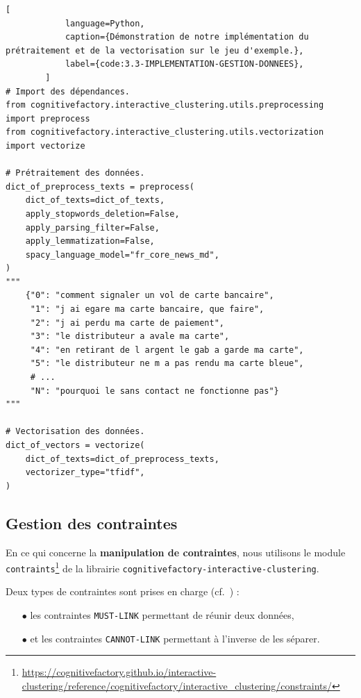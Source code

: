 		\begin{lstlisting}[
			language=Python,
			caption={Démonstration de notre implémentation du prétraitement et de la vectorisation sur le jeu d'exemple.},
			label={code:3.3-IMPLEMENTATION-GESTION-DONNEES},
		]
# Import des dépendances.
from cognitivefactory.interactive_clustering.utils.preprocessing import preprocess
from cognitivefactory.interactive_clustering.utils.vectorization import vectorize

# Prétraitement des données.
dict_of_preprocess_texts = preprocess(
    dict_of_texts=dict_of_texts,
    apply_stopwords_deletion=False,
    apply_parsing_filter=False,
    apply_lemmatization=False,
    spacy_language_model="fr_core_news_md",
)
"""
    {"0": "comment signaler un vol de carte bancaire",
     "1": "j ai egare ma carte bancaire, que faire",
     "2": "j ai perdu ma carte de paiement",
     "3": "le distributeur a avale ma carte",
     "4": "en retirant de l argent le gab a garde ma carte",
     "5": "le distributeur ne m a pas rendu ma carte bleue",
     # ...
     "N": "pourquoi le sans contact ne fonctionne pas"}
"""

# Vectorisation des données.
dict_of_vectors = vectorize(
    dict_of_texts=dict_of_preprocess_texts,
    vectorizer_type="tfidf",
)
		\end{lstlisting}
		
		\subsection{Gestion des contraintes}
		\label{section:3.3.2-GESTION-DES-CONTRAINTES}
		
		En ce qui concerne la \textbf{manipulation de contraintes}, nous utilisons le module \texttt{contraints}\footnote{\url{https://cognitivefactory.github.io/interactive-clustering/reference/cognitivefactory/interactive_clustering/constraints/}} de la librairie \texttt{cognitivefactory-interactive-clustering}.
		
		Deux types de contraintes sont prises en charge (cf.~\cite{wagstaff-cardie:2000:clustering-instancelevel-constraints}) :
		\begin{itemize}
			\item[\(\bullet\)] les contraintes \texttt{MUST-LINK} permettant de réunir deux données,
			\item[\(\bullet\)] et les contraintes \texttt{CANNOT-LINK} permettant à l'inverse de les séparer.
		\end{itemize}

